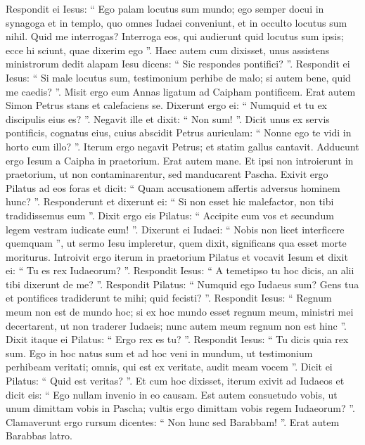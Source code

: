 \begin{biblechapter}
\begin{biblechapter}
\begin{biblechapter}
\begin{biblechapter}
\begin{biblechapter}
\begin{biblechapter}
\begin{biblechapter}
\begin{biblechapter}
\begin{biblechapter}
\begin{biblechapter}
\begin{biblechapter}
\begin{biblechapter}
\begin{biblechapter}
\begin{biblechapter}
\begin{biblechapter}
\begin{biblechapter}
\begin{biblechapter}
\begin{biblechapter}
 \verse Respondit ei Iesus: “ Ego palam locutus sum mundo; ego semper docui in synagoga et in templo, quo omnes Iudaei conveniunt, et in occulto locutus sum nihil. 
\verse Quid me interrogas? Interroga eos, qui audierunt quid locutus sum ipsis; ecce hi sciunt, quae dixerim ego ”. 
\verse Haec autem cum dixisset, unus assistens ministrorum dedit alapam Iesu dicens: “ Sic respondes pontifici? ”. 
\verse Respondit ei Iesus: “ Si male locutus sum, testimonium perhibe de malo; si autem bene, quid me caedis? ”. 
\verse Misit ergo eum Annas ligatum ad Caipham pontificem.
 \verse Erat autem Simon Petrus stans et calefaciens se. Dixerunt ergo ei: “ Numquid et tu ex discipulis eius es? ”. Negavit ille et dixit: “ Non sum! ”. 
\verse Dicit unus ex servis pontificis, cognatus eius, cuius abscidit Petrus auriculam: “ Nonne ego te vidi in horto cum illo? ”. 
\verse Iterum ergo negavit Petrus; et statim gallus cantavit.
 \verse Adducunt ergo Iesum a Caipha in praetorium. Erat autem mane. Et ipsi non introierunt in praetorium, ut non contaminarentur, sed manducarent Pascha. 
 \verse Exivit ergo Pilatus ad eos foras et dicit: “ Quam accusationem affertis adversus hominem hunc? ”. 
\verse Responderunt et dixerunt ei: “ Si non esset hic malefactor, non tibi tradidissemus eum ”. 
\verse Dixit ergo eis Pilatus: “ Accipite eum vos et secundum legem vestram iudicate eum! ”. Dixerunt ei Iudaei: “ Nobis non licet interficere quemquam ”, 
\verse ut sermo Iesu impleretur, quem dixit, significans qua esset morte moriturus.
 \verse Introivit ergo iterum in praetorium Pilatus et vocavit Iesum et dixit ei: “ Tu es rex Iudaeorum? ”. 
\verse Respondit Iesus: “ A temetipso tu hoc dicis, an alii tibi dixerunt de me? ”. 
\verse Respondit Pilatus: “ Numquid ego Iudaeus sum? Gens tua et pontifices tradiderunt te mihi; quid fecisti? ”. 
\verse Respondit Iesus: “ Regnum meum non est de mundo hoc; si ex hoc mundo esset regnum meum, ministri mei decertarent, ut non traderer Iudaeis; nunc autem meum regnum non est hinc ”. 
\verse Dixit itaque ei Pilatus: “ Ergo rex es tu? ”. Respondit Iesus: “ Tu dicis quia rex sum. Ego in hoc natus sum et ad hoc veni in mundum, ut testimonium perhibeam veritati; omnis, qui est ex veritate, audit meam vocem ”. 
\verse Dicit ei Pilatus: “ Quid est veritas? ”. Et cum hoc dixisset, iterum exivit ad Iudaeos et dicit eis: “ Ego nullam invenio in eo causam. 
\verse Est autem consuetudo vobis, ut unum dimittam vobis in Pascha; vultis ergo dimittam vobis regem Iudaeorum? ”. 
\verse Clamaverunt ergo rursum dicentes: “ Non hunc sed Barabbam! ”. Erat autem Barabbas latro.
 

\end{biblechapter}
\end{biblechapter}
\end{biblechapter}
\end{biblechapter}
\end{biblechapter}
\end{biblechapter}
\end{biblechapter}
\end{biblechapter}
\end{biblechapter}
\end{biblechapter}
\end{biblechapter}
\end{biblechapter}
\end{biblechapter}
\end{biblechapter}
\end{biblechapter}
\end{biblechapter}
\end{biblechapter}
\end{biblechapter}
